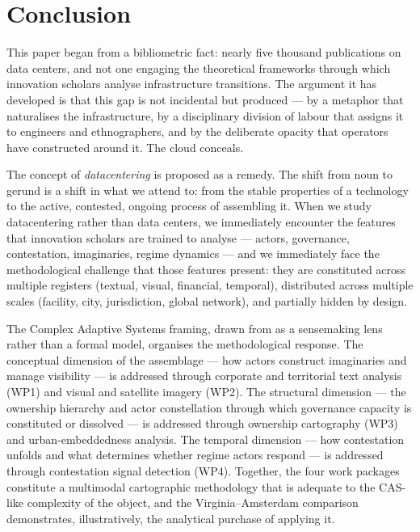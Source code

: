 \section{Conclusion}
\label{sec:conclusion}

This paper began from a bibliometric fact: nearly five thousand publications on data centers, and not one engaging the theoretical frameworks through which innovation scholars analyse infrastructure transitions. The argument it has developed is that this gap is not incidental but produced — by a metaphor that naturalises the infrastructure, by a disciplinary division of labour that assigns it to engineers and ethnographers, and by the deliberate opacity that operators have constructed around it. The cloud conceals.

The concept of \textit{datacentering} is proposed as a remedy. The shift from noun to gerund is a shift in what we attend to: from the stable properties of a technology to the active, contested, ongoing process of assembling it. When we study datacentering rather than data centers, we immediately encounter the features that innovation scholars are trained to analyse — actors, governance, contestation, imaginaries, regime dynamics — and we immediately face the methodological challenge that those features present: they are constituted across multiple registers (textual, visual, financial, temporal), distributed across multiple scales (facility, city, jurisdiction, global network), and partially hidden by design.

The Complex Adaptive Systems framing, drawn from \citet{phillips2019complex} as a sensemaking lens rather than a formal model, organises the methodological response. The conceptual dimension of the assemblage — how actors construct imaginaries and manage visibility — is addressed through corporate and territorial text analysis (WP1) and visual and satellite imagery (WP2). The structural dimension — the ownership hierarchy and actor constellation through which governance capacity is constituted or dissolved — is addressed through ownership cartography (WP3) and urban-embeddedness analysis. The temporal dimension — how contestation unfolds and what determines whether regime actors respond — is addressed through contestation signal detection (WP4). Together, the four work packages constitute a multimodal cartographic methodology that is adequate to the CAS-like complexity of the object, and the Virginia--Amsterdam comparison demonstrates, illustratively, the analytical purchase of applying it.

